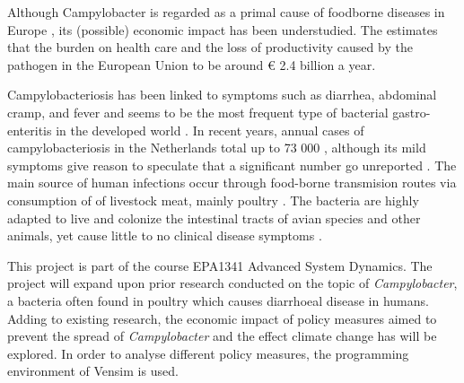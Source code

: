 \iffalse
1.	Establish field  -> Z
    a.	Societal relevance
2.	Outline problem in the field (Elias)
    a.	Scientific relevance
3.	Present solution to problem in the field
    a.	Problem statement/research question -> Z
    b.	Explain relevance of simulation method (Elias) considering the problem
4.	Reading guide -> Z

Target: 1000 words\
♫♪.ılılıll|̲̅̅●̲̅̅|̲̅̅=̲̅̅|̲̅̅●̲̅̅|llılılı.♫♪
\fi

Although Campylobacter is regarded as a primal cause of foodborne diseases in Europe \parencite{european_food_safety_authority_european_2019}
, its (possible) economic impact has been understudied. The \citeauthor{european_food_safety_authority_campylobacter_nodate} estimates that the burden on health care and the loss of productivity caused by the pathogen in the European Union to be around \euro{} 2.4 billion a year. %

Campylobacteriosis has been linked to symptoms such as diarrhea, abdominal cramp, and fever and seems to be the most frequent type of bacterial gastro-enteritis in the developed world \cite{fouts_major_2005}. In recent years, annual cases of campylobacteriosis in the Netherlands total up to 73 000 \cite{lagerweij_disease_2020}, although its mild symptoms give reason to speculate that a significant number go unreported \cite{}. The main source of human infections occur through food-borne transmision routes via consumption of of livestock meat, mainly poultry \cite{wilson_tracing_2008}. The bacteria are highly adapted to live and colonize the intestinal tracts of avian species and other animals, yet cause little to no clinical disease symptoms \cite{saif_diseases_2008}.





















This project is part of the course EPA1341 Advanced System Dynamics. The project will expand upon prior research conducted on the topic of \textit{Campylobacter}, a bacteria often found in poultry which causes diarrhoeal disease in humans. Adding to existing research, the economic impact of policy measures aimed to prevent the spread of  \textit{Campylobacter} and the effect climate change has will be explored. In order to analyse different policy measures, the programming environment of Vensim is used. 

